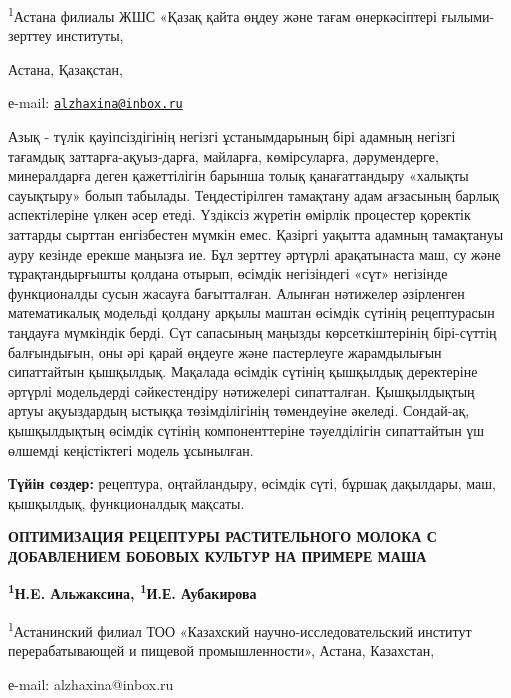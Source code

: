 \begin{affiliation}
\textsuperscript{1}Астана филиалы ЖШС «Қазақ қайта өңдеу және тағам
өнеркәсіптері ғылыми-зерттеу институты,

Астана, Қазақстан,

е-mail: \href{mailto:alzhaxina@inbox.ru}{\nolinkurl{alzhaxina@inbox.ru}}
\end{affiliation}

Азық - түлік қауіпсіздігінің негізгі ұстанымдарының бірі адамның негізгі
тағамдық заттарға-ақуыз-дарға, майларға, көмірсуларға, дәрумендерге,
минералдарға деген қажеттілігін барынша толық қанағаттандыру «халықты
сауықтыру» болып табылады. Теңдестірілген тамақтану адам ағзасының
барлық аспектілеріне үлкен әсер етеді. Үздіксіз жүретін өмірлік
процестер қоректік заттарды сырттан енгізбестен мүмкін емес. Қазіргі
уақытта адамның тамақтануы ауру кезінде ерекше маңызға ие. Бұл зерттеу
әртүрлі арақатынаста маш, су және тұрақтандырғышты қолдана отырып,
өсімдік негізіндегі «сүт» негізінде функционалды сусын жасауға
бағытталған. Алынған нәтижелер әзірленген математикалық модельді қолдану
арқылы маштан өсімдік сүтінің рецептурасын таңдауға мүмкіндік берді. Сүт
сапасының маңызды көрсеткіштерінің бірі-сүттің балғындығын, оны әрі
қарай өңдеуге және пастерлеуге жарамдылығын сипаттайтын қышқылдық.
Мақалада өсімдік сүтінің қышқылдық деректеріне әртүрлі модельдерді
сәйкестендіру нәтижелері сипатталған. Қышқылдықтың артуы ақуыздардың
ыстыққа төзімділігінің төмендеуіне әкеледі. Сондай-ақ, қышқылдықтың
өсімдік сүтінің компоненттеріне тәуелділігін сипаттайтын үш өлшемді
кеңістіктегі модель ұсынылған.

{\bfseries Түйін сөздер:} рецептура, оңтайландыру, өсімдік сүті, бұршақ
дақылдары, маш, қышқылдық, функционалдық мақсаты.

\begin{articleheader}
{\bfseries ОПТИМИЗАЦИЯ РЕЦЕПТУРЫ РАСТИТЕЛЬНОГО МОЛОКА С ДОБАВЛЕНИЕМ БОБОВЫХ
КУЛЬТУР НА ПРИМЕРЕ МАША}

{\bfseries \textsuperscript{1}Н.E. Альжаксина, \textsuperscript{1}И.Е.
Аубакирова}
\end{articleheader}

\begin{affiliation}
\textsuperscript{1}Астанинский филиал ТОО «Казахский
научно-исследовательский институт перерабатывающей и пищевой
промышленности», Астана, Казахстан,

е-mail: alzhaxina@inbox.ru
\end{affiliation}

